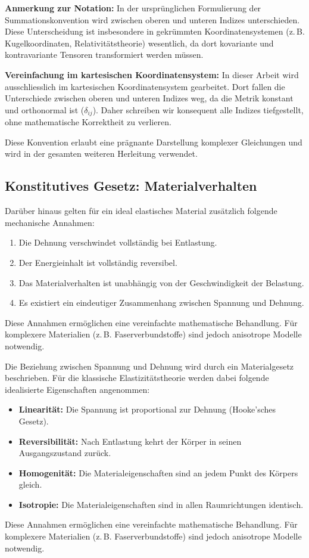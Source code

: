 \textbf{Anmerkung zur Notation:} In der ursprünglichen Formulierung der Summationskonvention wird zwischen oberen und unteren Indizes unterschieden. Diese Unterscheidung ist insbesondere in gekrümmten Koordinatensystemen (z.\,B. Kugelkoordinaten, Relativitätstheorie) wesentlich, da dort kovariante und kontravariante Tensoren transformiert werden müssen.


\textbf{Vereinfachung im kartesischen Koordinatensystem:} In dieser Arbeit wird ausschliesslich im kartesischen Koordinatensystem gearbeitet. Dort fallen die Unterschiede zwischen oberen und unteren Indizes weg, da die Metrik konstant und orthonormal ist ($\delta_{ij}$). Daher schreiben wir konsequent alle Indizes tiefgestellt, ohne mathematische Korrektheit zu verlieren.

Diese Konvention erlaubt eine prägnante Darstellung komplexer Gleichungen und wird in der gesamten weiteren Herleitung verwendet.

\subsection{Konstitutives Gesetz: Materialverhalten}
Darüber hinaus gelten für ein ideal elastisches Material zusätzlich folgende mechanische Annahmen:
\begin{enumerate}
	\item Die Dehnung verschwindet vollständig bei Entlastung.
	\item Der Energieinhalt ist vollständig reversibel.
	\item Das Materialverhalten ist unabhängig von der Geschwindigkeit der Belastung.
	\item Es existiert ein eindeutiger Zusammenhang zwischen Spannung und Dehnung.
\end{enumerate}
Diese Annahmen ermöglichen eine vereinfachte mathematische Behandlung. 
Für komplexere Materialien (z. B. Faserverbundstoffe) sind jedoch anisotrope Modelle notwendig.

Die Beziehung zwischen Spannung und Dehnung wird durch ein Materialgesetz beschrieben. Für die klassische Elastizitätstheorie werden dabei folgende idealisierte Eigenschaften angenommen:
\begin{itemize}
	\item \textbf{Linearität:} Die Spannung ist proportional zur Dehnung (Hooke’sches Gesetz).
	\item \textbf{Reversibilität:} Nach Entlastung kehrt der Körper in seinen Ausgangszustand zurück.
	\item \textbf{Homogenität:} Die Materialeigenschaften sind an jedem Punkt des Körpers gleich.
	\item \textbf{Isotropie:} Die Materialeigenschaften sind in allen Raumrichtungen identisch.
\end{itemize}
Diese Annahmen ermöglichen eine vereinfachte mathematische Behandlung. Für komplexere Materialien (z. B. Faserverbundstoffe) sind jedoch anisotrope Modelle notwendig.

